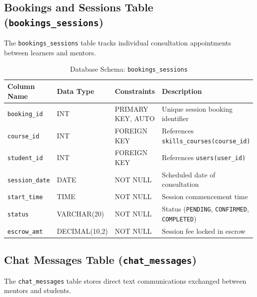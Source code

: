 \documentclass[12pt,a4paper]{report}
\begin{document}
\subsection{Bookings and Sessions Table (\texttt{bookings\_sessions})}
The \texttt{bookings\_sessions} table tracks individual consultation appointments between learners and mentors.

\begin{table}[H]
\centering
\small
\caption{Database Schema: \texttt{bookings\_sessions}}
\label{tab:schema_bookings_sessions}
\begin{tabularx}{\textwidth}{|L{3.0cm}|L{2.8cm}|L{2.5cm}|J|}
\hline
\textbf{Column Name} & \textbf{Data Type} & \textbf{Constraints} & \textbf{Description} \\ \hline
\texttt{booking\_id} & INT & PRIMARY KEY, AUTO & Unique session booking identifier \\ \hline
\texttt{course\_id} & INT & FOREIGN KEY & References \texttt{skills\_courses(course\_id)} \\ \hline
\texttt{student\_id} & INT & FOREIGN KEY & References \texttt{users(user\_id)} \\ \hline
\texttt{session\_date} & DATE & NOT NULL & Scheduled date of consultation \\ \hline
\texttt{start\_time} & TIME & NOT NULL & Session commencement time \\ \hline
\texttt{status} & VARCHAR(20) & NOT NULL & Status (\texttt{PENDING}, \texttt{CONFIRMED}, \texttt{COMPLETED}) \\ \hline
\texttt{escrow\_amt} & DECIMAL(10,2) & NOT NULL & Session fee locked in escrow \\ \hline
\end{tabularx}
\end{table}

\subsection{Chat Messages Table (\texttt{chat\_messages})}
The \texttt{chat\_messages} table stores direct text communications exchanged between mentors and students.
\end{document}
